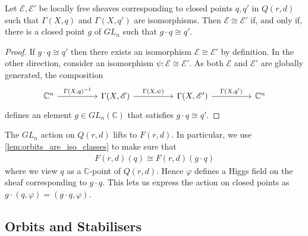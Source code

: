 \documentclass[12pt]{ociamthesis}  %
\begin{document}
\begin{lemma}\label{lem:orbits_are_iso_classes}
  Let $\mathscr E,\mathscr E'$ be locally free sheaves corresponding
  to closed points $q,q'$ in $Q(r,d)$ such that
  $\Gamma(X,q)$ and $\Gamma(X,q')$ are isomorphisms.
  Then $\mathscr E\cong\mathscr E'$
  if, and only if, there is a closed point $g$ of $GL_n$
  such that $g\cdot q \cong q'$.
  \begin{proof}
    If $g\cdot q \cong q'$ then there exists an isomorphism
    $\mathscr E\cong\mathscr E'$ by definition. In the other direction,
    consider an isomorphism $\psi:\mathscr E\cong\mathscr E'$.
    As both $\mathscr E$ and $\mathscr E'$ are globally generated,
    the composition
    \begin{equation*}
      \begin{tikzcd}
        {\mathbb C^n} && {\Gamma(X,\mathscr E)} && {\Gamma(X,\mathscr E')} && {\mathbb C^n}
        \arrow["{\Gamma(X,q)^{-1}}", from=1-1, to=1-3]
        \arrow["{\Gamma(X,\psi)}", from=1-3, to=1-5]
        \arrow["{\Gamma(X,q')}", from=1-5, to=1-7]
      \end{tikzcd}
    \end{equation*}
    defines an element $g\in GL_n(\mathbb C)$ that satisfies
    $g\cdot q \cong q'$.
  \end{proof}
\end{lemma}

\begin{example}
  The $GL_n$ action on $Q(r,d)$ lifts to $F(r,d)$.
  In particular, we use \ref{lem:orbits_are_iso_classes} to make sure
  that
  \begin{align*}
    F(r,d)(q) \cong F(r,d)(g\cdot q)
  \end{align*}
  where we view $q$ as a $\mathbb C$-point of $Q(r,d)$. Hence
  $\varphi$ defines a Higgs field on the sheaf corresponding to
  $g\cdot q$. This lets us express the action on closed points
  as $g\cdot(q,\varphi) = (g\cdot q,\varphi)$.
\end{example}

\subsection{Orbits and Stabilisers}
\end{document}
